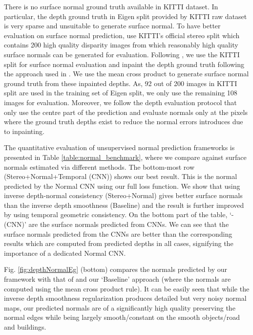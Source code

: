 \documentclass[letterpaper, 10 pt, conference]{ieeeconf}
\begin{document}
There is no surface normal ground truth available in KITTI dataset. 
In particular, the depth ground truth in Eigen split provided by KITTI raw dataset is very sparse and unsuitable to generate surface normal. 
To have better evaluation on surface normal prediction, \cite{yang2017depthnormal}\cite{yang2018lego} use KITTI's official stereo split which contains 200 high quality disparity images from which reasonably high quality surface normals can be generated for evaluation. 
Following \cite{yang2017depthnormal}\cite{yang2018lego}, we use the KITTI split for surface normal evaluation and inpaint the depth ground truth following the approach used in \cite{Silberman2012nyuv2}. We use the mean cross product to generate surface normal ground truth from these inpainted depths.
As, 92 out of 200 images in KITTI split are used in the training set of Eigen split, we only use the remaining 108 images for evaluation.
Moreover, we follow the depth evaluation protocol \cite{godard2016depth} that only use the centre part of the prediction and evaluate normals only at the pixels where the ground truth depths exist to reduce the normal errors introduces due to inpainting.

The quantitative evaluation of unsupervised normal prediction frameworks is presented in Table \ref{table:normal_benchmark}, where we compare against surface normals estimated via different methods. The bottom-most row (Stereo+Normal+Temporal (CNN)) shows our best result. This is the normal predicted by the Normal CNN using our full loss function.
We show that using inverse depth-normal consistency (Stereo+Normal) gives better surface normals than the inverse depth smoothness (Baseline) and the result is further improved by using temporal geometric consistency.
On the bottom part of the table, `- (CNN)' are the surface normals predicted from CNNs. 
We can see that the surface normals predicted from the CNNs are better than the corresponding results which are computed from predicted depths in all cases, signifying the importance of a dedicated Normal CNN. 


Fig. \ref{fig:depthNormalEg} (bottom) compares the normals predicted by our framework with that of \cite{yang2018lego,yang2017unsupervised} and our `Baseline' approach (where the normals are computed using the mean cross product rule). 
It can be easily seen that while the inverse depth smoothness regularization produces detailed but very noisy normal maps, our predicted normals are of a significantly high quality preserving the normal edges while being largely smooth/constant on the smooth objects/road and buildings.
\end{document}
